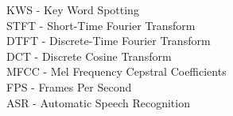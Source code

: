 KWS - Key Word Spotting\\
STFT - Short-Time Fourier Transform\\
DTFT - Discrete-Time Fourier Transform\\
DCT - Discrete Cosine Transform\\
MFCC - Mel Frequency Cepstral Coefficients\\
FPS - Frames Per Second\\
ASR - Automatic Speech Recognition\\